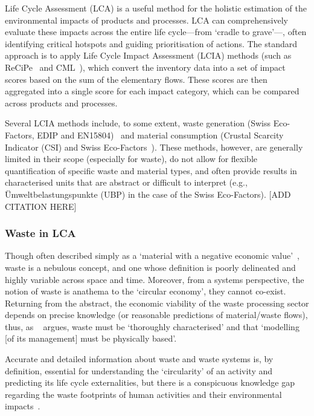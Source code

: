 Life Cycle Assessment (LCA) is a useful method for the holistic estimation of the environmental impacts of products and processes. LCA can comprehensively evaluate these impacts across the entire life cycle---from `cradle to grave'---, often identifying critical hotspots and guiding prioritisation of actions. The standard approach is to apply Life Cycle Impact Assessment (LCIA) methods (such as ReCiPe~\citep{huijbregts2016recipe} and CML~\citep{guinee2002cml}), which convert the inventory data into a set of impact scores based on the sum of the elementary flows. These scores are then aggregated into a single score for each impact category, which can be compared across products and processes.

Several LCIA methods include, to some extent, waste generation (Swiss Eco-Factors, EDIP and EN15804)~\citep{foen2021ecofactors,hauschild2003edip,cen2019en15804} and material consumption (Crustal Scarcity Indicator (CSI) and Swiss Eco-Factors~\citep{arvidsson2020csi,foen2021ecofactors}). These methods, however, are generally limited in their scope (especially for waste), do not allow for flexible quantification of specific waste and material types, and often provide results in characterised units that are abstract or difficult to interpret (e.g., Ümweltbelastungspunkte (UBP) in the case of the Swiss Eco-Factors). [ADD CITATION HERE]


\subsubsection{Waste in LCA}

Though often described simply as a `material with a negative economic value'~\citep{guinee2004economicallocation}, waste is a nebulous concept, and one whose definition is poorly delineated and highly variable across space and time.  Moreover, from a systems perspective, the notion of waste is anathema to the `circular economy', they cannot co-exist. Returning from the abstract, the economic viability of the waste processing sector depends on precise knowledge (or reasonable predictions of material/waste flows), thus, as ~\cite{bisinella2024wastelca} argues, waste must be `thoroughly characterised' and that `modelling [of its management] must be physically based'. 

Accurate and detailed information about waste and waste systems is, by definition, essential for understanding the `circularity' of an activity and predicting its life cycle externalities, but there is a conspicuous knowledge gap regarding the waste footprints of human activities and their environmental impacts~\citep{laurenti2023wastefootprint}. 


